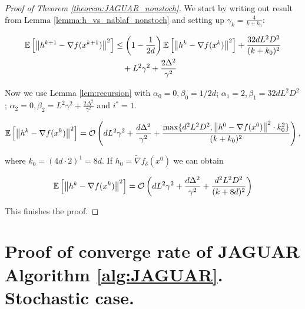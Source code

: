         \begin{proof}[Proof of Theorem \ref{theorem:JAGUAR_nonstoch}]
            We start by writing out result from Lemma \ref{lemma:h_vs_nablaf_nonstoch} and setting up $\gamma_k = \frac{4}{k + k_0}$:

            \begin{equation*}
            \begin{split}
                \mathbb{E}\left[ \left\| h^{k+1} - \nabla f(x^{k+1}) \right\|^2 \right]
                &\leq
                \left(1 - \frac{1}{2 d}\right) \mathbb{E}\left[ \left\| h^{k} - \nabla f(x^{k}) \right\|^2 \right]
                + \frac{32 d L^2 D^2}{(k + k_0)^2} 
                \\&\quad+ L^2 \gamma^2 
                + \frac{2 \Delta^2}{\gamma^2}
            \end{split}
            \end{equation*}
    
            Now we use Lemma \ref{lem:recursion} with $\alpha_0 = 0, \beta_0 = 1/2d$;
            $\alpha_1 = 2, \beta_1 = 32d L^2 D^2$;
            $\alpha_2 = 0, \beta_2 = L^2 \gamma^2 + \frac{2 \Delta^2}{\gamma^2}$ and $i^* = 1$.
    
            \begin{equation*}
                \mathbb{E}\left[ \left\| h^{k} - \nabla f(x^{k}) \right\|^2 \right] = 
                \mathcal{O} \left( d L^2 \gamma^2 
                + \frac{d \Delta^2}{\gamma^2}
                +\frac{\max\{d^2 L^2 D^2, \left\| h^0 - \nabla f(x^0) \right\|^2 \cdot k_0^2\}}{(k + k_0)^2} \right),
            \end{equation*}
    
            where $k_0 = (4d \cdot 2)^1 = 8d$. If $h_0 = \widetilde{\nabla} f_\delta(x^0)$ we can obtain
    
            \begin{equation*}
                \mathbb{E}\left[ \left\| h^{k} - \nabla f(x^{k}) \right\|^2 \right] = 
                \mathcal{O} \left( d L^2 \gamma^2 
                + \frac{d \Delta^2}{\gamma^2}
                +\frac{d^2 L^2 D^2}{(k + 8d)^2} \right)
            \end{equation*}

            This finishes the proof.
        \end{proof}
        
    \section{Proof of converge rate of JAGUAR Algorithm \ref{alg:JAGUAR}. Stochastic case.} \label{appendix:JAGUAR}


